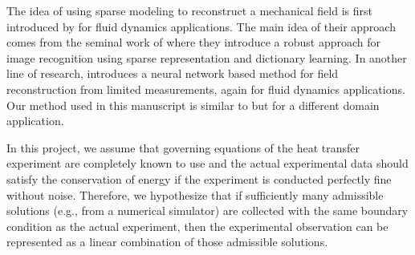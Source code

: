 \documentclass[conference]{IEEEtran}
\begin{document}
The idea of using sparse modeling to reconstruct a mechanical field is first introduced by \cite{CallahamRobust2019} for fluid dynamics applications. The main idea of their approach comes from the seminal work of \cite{WrightRobust2008} where they introduce a robust approach for image recognition using sparse representation and dictionary learning. In another line of research, \cite{Erichson2020} introduces a neural network based method for field reconstruction from limited measurements, again for fluid dynamics applications. Our method used in this manuscript is similar to \cite{CallahamRobust2019,WrightRobust2008} but for a different domain application.

In this project, we assume that governing equations of the heat transfer experiment are completely known to use and the actual experimental data should satisfy the conservation of energy if the experiment is conducted perfectly fine without noise. Therefore, we hypothesize that if sufficiently many admissible solutions (e.g., from a numerical simulator) are collected with the same boundary condition as the actual experiment, then the experimental observation can be represented as a linear combination of those admissible solutions.
\end{document}
